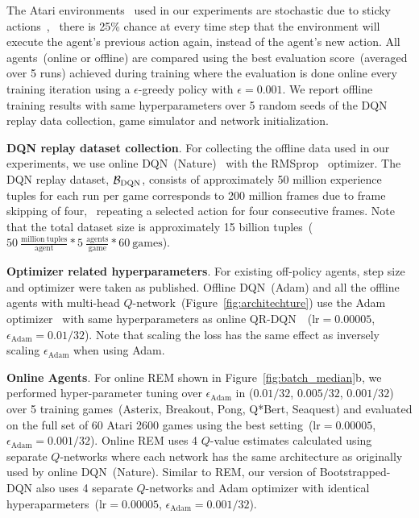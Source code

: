 The Atari environments~\citep{bellemare2013arcade} used in our experiments are stochastic due to sticky actions~\citep{machado2018revisiting}, \ie\ there is 25\% chance at every time step that the environment will execute the agent's previous action again, instead of the agent's new action. All agents~(online or offline) are compared using the best evaluation score~(averaged over 5 runs) achieved during training where the evaluation is done online every training iteration using a $\epsilon$-greedy policy with $\epsilon=0.001$. We report offline training results with same hyperparameters over 5 random seeds of the DQN replay data collection, game simulator and network initialization.

{\bf DQN replay dataset collection}. For collecting the offline data used in our experiments, we use online DQN~(Nature)~\citep{mnih2015human} with the RMSprop~\citep{tieleman2012lecture} optimizer. The DQN replay dataset, $\mathcal{B}_{\mathrm{DQN}}$, consists of approximately 50 million experience tuples for each run per game corresponds to 200 million frames due to frame skipping of four, \ie~repeating a selected action for four consecutive frames. Note that the total dataset size is approximately 15 billion tuples~(
$50~\frac{\mathrm{million\ tuples}}{\mathrm{agent}} * 5~\frac{\mathrm{agents}}{\mathrm{game}} * 60~\mathrm{games}$).

{\bf Optimizer related hyperparameters}. For existing off-policy agents, step size and optimizer were taken as published. Offline DQN~(Adam) and all the offline agents with multi-head $Q$-network~(Figure~\ref{fig:architechture}) use the Adam optimizer~\citep{kingma2014adam} with same hyperparameters as online QR-DQN~\citep{dabney2018distributional}~($\mathrm{lr}=0.00005$, $\epsilon_{\mathrm{Adam}}=0.01/32$).
Note that scaling the loss has the same effect as inversely scaling $\epsilon_{\mathrm{Adam}}$ when using Adam.

{\bf Online Agents}. For online REM shown in Figure~\ref{fig:batch_median}b, we performed hyper-parameter tuning over $\epsilon_{\mathrm{Adam}}$ in ($0.01/32$, $0.005/32$, $0.001/32$) over 5 training games~(Asterix, Breakout, Pong, Q*Bert, Seaquest) and evaluated on the full set of 60 Atari 2600 games using the best setting~($\mathrm{lr}=0.00005$, $\epsilon_{\mathrm{Adam}}=0.001/32$). Online REM uses 4 $Q$-value estimates calculated using separate $Q$-networks where each network has the same architecture as originally used by online DQN~(Nature). Similar to REM, our version of Bootstrapped-DQN also uses 4 separate $Q$-networks and Adam optimizer with identical hyperaparmeters~($\mathrm{lr}=0.00005$, $\epsilon_{\mathrm{Adam}}=0.001/32$).

